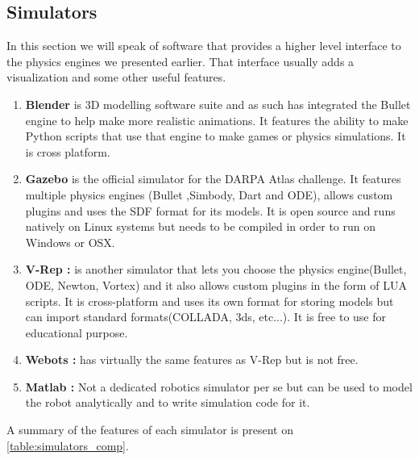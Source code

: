\subsection{Simulators}
In this section we will speak of software that provides a higher level interface to the physics engines we presented earlier. That interface usually adds a visualization and some other useful features.
\begin{enumerate}

\item \textbf{Blender\cite{Bruyninckx04}} is 3D modelling software suite and as such has integrated the Bullet engine to help make more realistic animations. It features the ability to make Python scripts that use that engine to make games or physics simulations. It is cross platform.

\item \textbf{Gazebo} is the official simulator for the DARPA Atlas challenge. It features multiple physics engines (Bullet ,Simbody, Dart and ODE), allows custom plugins and uses the SDF format for its models. It is open source and runs natively on Linux systems but needs to be compiled in order to run on Windows or OSX.

\item \textbf{V-Rep :} is another simulator that lets you choose the physics engine(Bullet, ODE, Newton, Vortex) and it also allows custom plugins in the form of LUA scripts. It is cross-platform and uses its own format for storing models but can import standard formats(COLLADA, 3ds, etc...). It is free to use for educational purpose.

\item \textbf{Webots :} has virtually the same features as V-Rep but is not free.

\item \textbf{Matlab :} Not a dedicated robotics simulator per se but can be used to model the robot analytically and to write simulation code for it. 
\end{enumerate}

A summary of the features of each simulator is present on \cref{table:simulators_comp}.

